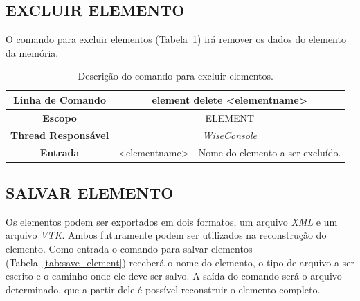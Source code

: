 \subsection{EXCLUIR ELEMENTO}\label{sec:delete_element}

O comando para excluir elementos (Tabela~\ref{tab:delete_element}) irá remover os dados do elemento da memória.

\begin{center}
	\begin{table}[!htbp]
		\begin{tabularx}{\textwidth}{c|c|X}
			\toprule
			\textbf{Linha de Comando} & \multicolumn{2}{c}{element delete <element\underline{\space\space}name>} \\
			\midrule
			\textbf{Escopo} & \multicolumn{2}{c}{ELEMENT} \\
			\hline
			\textbf{Thread Responsável} & \multicolumn{2}{c}{\textit{WiseConsole}} \\
			\hline
			\textbf{Entrada} & <element\underline{\space\space}name> & Nome do elemento a ser excluído. \\
			\bottomrule
		\end{tabularx}
		\caption{Descrição do comando para excluir elementos.}
		\label{tab:delete_element}
	\end{table}
\end{center}

\subsection{SALVAR ELEMENTO}\label{sec:save_element}

Os elementos podem ser exportados em dois formatos, um arquivo \textit{XML} e um arquivo \textit{VTK}. Ambos futuramente podem ser utilizados na reconstrução do elemento. Como entrada o comando para salvar elementos (Tabela~\ref{tab:save_element}) receberá o nome do elemento, o tipo de arquivo a ser escrito e o caminho onde ele deve ser salvo. A saída do comando será o arquivo determinado, que a partir dele é possível reconstruir o elemento completo.


